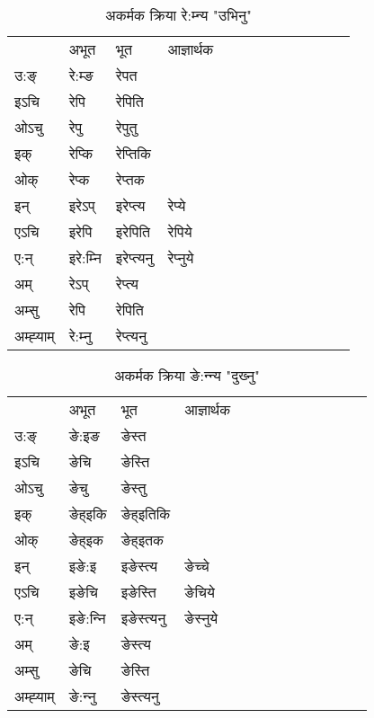 \begin{table}[H]
\centering
\caption{\label{ep.vi} अकर्मक क्रिया  रे:म्‍न्य  "उभिनु"  }
\begin{tabular}{l|l|l|l|l|l|l|l|l|l|l|l|l}  \toprule
&अभूत & भूत & आज्ञार्थक \\ 
उ:ङ्‌ &रे:म्ङ &रेपत \\ 
इऽचि &रेपि &रेपिति   \\ 
ओऽचु &रेपु &रेपुतु   \\ 
इक् &रेप्कि &रेप्‍तिकि   \\ 
ओक् &रेप्क &रेप्‍तक   \\ 
इन् & इरेऽप् & इरेप्‍त्य &रेप्ये  \\ 
एऽचि & इरेपि & इरेपिति &रेपिये    \\ 
ए:न् & इरे:म्‍नि  & इरेप्‍त्यनु &रेप्‍नुये  \\ 
अम् & रेऽप् & रेप्‍त्य   \\ 
अम्सु & रेपि & रेपिति   \\ 
अम्ह्‍याम् & रे:म्‍नु  & रेप्‍त्यनु \\ 
\bottomrule
\end{tabular}
\end{table}


\begin{table}[H]
\centering
\caption{\label{et.vi} अकर्मक क्रिया  ङे:न्‍न्य  "दुख्‍नु"  }
\begin{tabular}{l|l|l|l|l|l|l|l|l|l|l|l|l}  \toprule
&अभूत & भूत & आज्ञार्थक \\ 
उ:ङ्‌ &ङे:इङ &ङेस्त \\ 
इऽचि &ङेचि &ङेस्ति   \\ 
ओऽचु &ङेचु &ङेस्तु   \\ 
इक् &ङेह्इकि &ङेह्इतिकि   \\ 
ओक् &ङेह्इक &ङेह्इतक   \\ 
इन् & इङे:इ & इङेस्त्य &ङेच्‍चे  \\ 
एऽचि & इङेचि & इङेस्ति &ङेचिये    \\ 
ए:न् & इङे:न्‍नि  & इङेस्त्यनु &ङेस्‍नुये  \\ 
अम् & ङे:इ & ङेस्त्य   \\ 
अम्सु & ङेचि & ङेस्ति   \\ 
अम्ह्‍याम् & ङे:न्‍नु  & ङेस्त्यनु \\ 
\bottomrule
\end{tabular}
\end{table}



